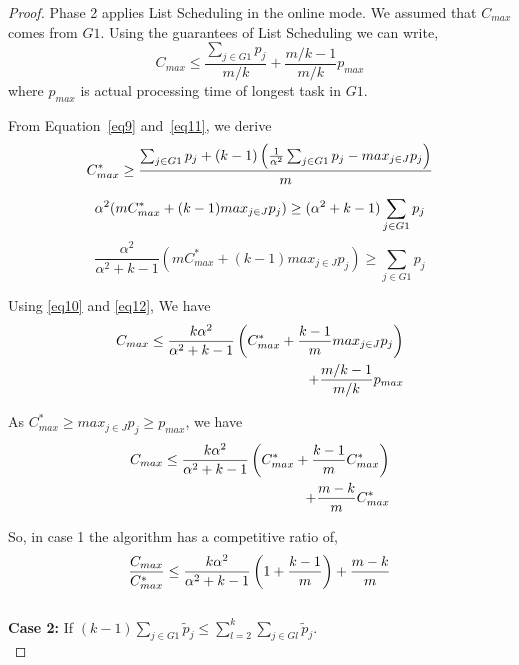 \documentclass[10pt, conference, compsocconf]{IEEEtran}
\begin{document}
\begin{proof}
  Phase 2 applies List Scheduling in the online mode. We assumed that
  $C_{max}$ comes from $G1$. Using the guarantees of List Scheduling
  we can write,
  \begin{equation}\label{eq10}
    C_{max} \leq \frac{\sum_{j \in G1 }^{}{{p_{j}}}}{m/k} + {\frac{m/k-1}{m/k}} p_{max}
  \end{equation}
  where $p_{max}$ is actual processing time of longest task in $G1$.

  From Equation~\ref{eq9} and~\ref{eq11}, we derive
  \begin{equation}{\nonumber}
    C_{max}^{*} \geq  \frac{\sum_{j \in G1 }^{}{{p_{j}}}+ (k-1)\left(\frac{1}{\alpha^{2}}\sum_{j \in G1 }^{}{{p_{j}}}-  {max_{j \in J}}{{p_{j}}}\right)}{m}
  \end{equation}
  \begin{equation}{\nonumber}
    \alpha^{2} (mC_{max}^{*} + (k-1){max_{j \in J}}{{p_{j}}}) \geq  (\alpha^{2} + k-1) \sum_{j \in G1 }^{}{{p_{j}}}  
  \end{equation}
  \begin{equation}\label{eq12}
    \frac{\alpha^{2}}{\alpha^{2}+k-1}\left(m C_{max}^{*}+(k-1) {max_{j \in J}}{{p_{j}}}\right) \geq \sum_{j \in G1 }^{}{{p_{j}}}  
  \end{equation}
  
  Using \ref{eq10} and \ref{eq12}, We have
  \begin{align}{\nonumber}
    C_{max} \leq \frac{k\alpha^{2}}{\alpha^{2}+k-1}\left( C_{max}^{*}+\frac{k-1}{m} {max_{j \in J}}{{p_{j}}}\right)\\
    + {\frac{m/k-1}{m/k}} p_{max} \nonumber
  \end{align}
  
  As $C_{max}^{*}\geq {{max_{j \in J}}{p_{j}}}\geq p_{max}$, we have
  \begin{align}{\nonumber}
    C_{max} \leq \frac{k\alpha^{2}}{\alpha^{2}+k-1}\left( C_{max}^{*}+ {\frac{k-1}{m}}{C_{max}^{*}}\right)\\
    + {\frac{m-k}{m}} C_{max}^{*} \nonumber
  \end{align}    
  
  So, in case 1 the algorithm has a competitive ratio of,
  \begin{equation}{\nonumber}
    \frac{C_{max}}{C_{max}^{*}} \leq \frac{k\alpha^{2}}{\alpha^{2}+k-1}\left( 1+ {\frac{k-1}{m}} \right) + {\frac{m-k}{m}} \end{equation}\\
  
  \textbf{Case 2:} If $(k-1)\sum_{j \in G1 }^{}{\tilde p_{j}} \leq \sum_{l=2}^{k}\sum_{j \in Gl }^{}{\tilde p_{j}}$. \\
  

\end{proof}
\end{document}
